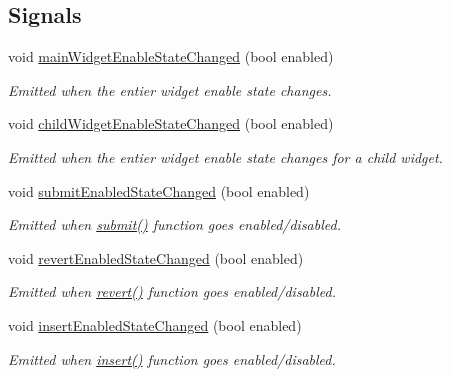 \subsection*{Signals}
\begin{DoxyCompactItemize}
\item 
void \hyperlink{classmdt_abstract_sql_table_controller_a8d66e50ce83d61646fbf1da25f146a91}{main\-Widget\-Enable\-State\-Changed} (bool enabled)
\begin{DoxyCompactList}\small\item\em Emitted when the entier widget enable state changes. \end{DoxyCompactList}\item 
void \hyperlink{classmdt_abstract_sql_table_controller_afe193a790eadc0912cc9a7dc4a307721}{child\-Widget\-Enable\-State\-Changed} (bool enabled)
\begin{DoxyCompactList}\small\item\em Emitted when the entier widget enable state changes for a child widget. \end{DoxyCompactList}\item 
void \hyperlink{classmdt_abstract_sql_table_controller_a3690e3c30d0fb7519915022253372376}{submit\-Enabled\-State\-Changed} (bool enabled)
\begin{DoxyCompactList}\small\item\em Emitted when \hyperlink{classmdt_abstract_sql_table_controller_a14f3e2a91fc30ca0e018944f4f95bc33}{submit()} function goes enabled/disabled. \end{DoxyCompactList}\item 
void \hyperlink{classmdt_abstract_sql_table_controller_af735dd48338c652562977f98c65dc345}{revert\-Enabled\-State\-Changed} (bool enabled)
\begin{DoxyCompactList}\small\item\em Emitted when \hyperlink{classmdt_abstract_sql_table_controller_a36af2665b6d742aba3bc7f6ee6b2a6c4}{revert()} function goes enabled/disabled. \end{DoxyCompactList}\item 
void \hyperlink{classmdt_abstract_sql_table_controller_af0f0bf9f3aef759a1babb2dd5b91950e}{insert\-Enabled\-State\-Changed} (bool enabled)
\begin{DoxyCompactList}\small\item\em Emitted when \hyperlink{classmdt_abstract_sql_table_controller_a82e88e4ff610f73b629bb6d2f229d1aa}{insert()} function goes enabled/disabled. \end{DoxyCompactList}\item 

\end{DoxyCompactItemize}
